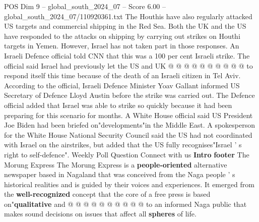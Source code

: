 \begin{textsample}{POS Dim 9 – global\_south\_2024\_07 – Score 6.00 – global\_south\_2024\_07/110920361.txt}
The Houthis have also regularly attacked US targets and commercial shipping in the Red Sea.
Both the UK and the US have responded to the attacks on shipping by carrying out strikes on Houthi targets in Yemen.
However, Israel has not taken part in those responses.
An Israeli Defence official told CNN that this was a 100 per cent Israeli strike.
The official said Israel had previously let the US and UK @ @ @ @ @ @ @ @ @ @ to respond itself this time because of the death of an Israeli citizen in Tel Aviv.
According to the official, Israeli Defence Minister Yoav Gallant informed US Secretary of Defence Lloyd Austin before the strike was carried out.
The Defence official added that Israel was able to strike so quickly because it had been preparing for this scenario for months.
A White House official said US President Joe Biden had been briefed on"developments"in the Middle East.
A spokesperson for the White House National Security Council said the US had not coordinated with Israel on the airstrikes, but added that the US fully recognises"Israel ' s right to self-defence".
Weekly Poll Question Connect with us \textbf{Intro} \textbf{footer} The Morung Express The Morung Express is a \textbf{people-oriented} alternative newspaper based in Nagaland that was conceived from the Naga people ' s historical realities and is guided by their voices and experiences.
It emerged from the \textbf{well-recognized} concept that the core of a free press is based on"\textbf{qualitative} and @ @ @ @ @ @ @ @ @ @ to an informed Naga public that makes sound decisions on issues that affect all \textbf{spheres} of life.

\end{textsample}
